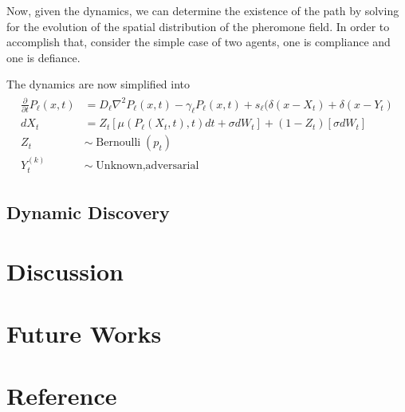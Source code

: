 \documentclass[12pt]{article}
\begin{document}
Now, given the dynamics, we can determine the existence of the path by solving for the evolution of the spatial distribution of the pheromone field. In order to accomplish that, consider the simple case of two agents, one is compliance and one is defiance.

The dynamics are now simplified into
\begin{align}
\begin{split}
  \frac{\partial}{\partial t} P_{\ell}(x,t) &= D_\ell \nabla^2 P_\ell (x,t) - \gamma_\ell P_\ell(x,t) + s_\ell(\delta(x-X_t)+\delta(x-Y_t)\\
  dX_t&= Z_t\left[\mu(P_\ell(X_t,t),t)dt + \sigma dW_t\right] + (1-Z_t)\left[\sigma dW_t\right]\\
  Z_t &\sim \operatorname{Bernoulli}(p_t)\\
  Y_t^{(k)} &\sim \operatorname{Unknown, adversarial}
  \end{split}
\end{align}
\subsection{Dynamic Discovery}
\section{Discussion}
\section{Future Works}
\section{Reference}
\end{document}
